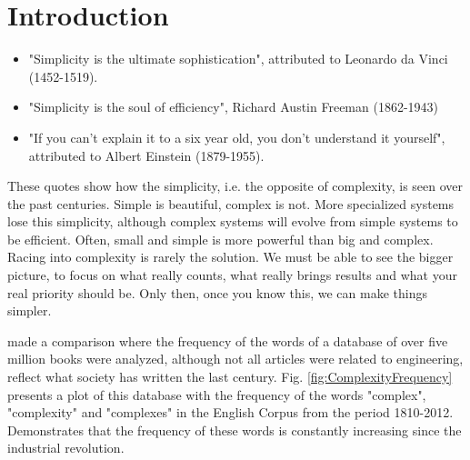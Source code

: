 \section{Introduction}
\begin{itemize}
\item "Simplicity is the ultimate sophistication", attributed to Leonardo da Vinci (1452-1519).
\item "Simplicity is the soul of efficiency", Richard Austin Freeman (1862-1943)
\item "If you can't explain it to a six year old, you don't understand it yourself", attributed to Albert Einstein (1879-1955).
\end{itemize}

These quotes show how the simplicity, i.e. the opposite of complexity, is seen over the past centuries. Simple is beautiful, complex is not. 
More specialized systems lose this simplicity, although complex systems will evolve from simple systems to be efficient.
Often, small and simple is more powerful than big and complex. Racing into complexity is rarely the solution. We must be able to see the bigger picture, to focus on what really counts, what really brings results and what your real priority should be. Only then, once you know this, we can make things simpler.

\cite{Davies10} made a comparison where the frequency of the words of a database of over five million books were analyzed, although not all articles were related to engineering, reflect what society has written the last century. Fig. \ref{fig:ComplexityFrequency} presents a plot of this database with the frequency of the words "complex", "complexity" and "complexes" in the English Corpus from the period 1810-2012. Demonstrates that the frequency of these words is constantly increasing since the industrial revolution.

